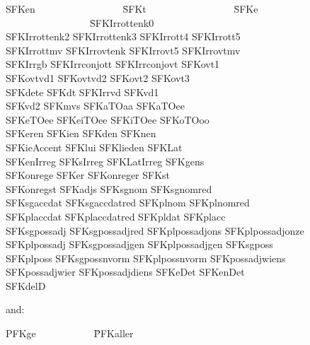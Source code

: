 \begin{tabbing}
SFKen \ \ \ \ \ \ \ \ \ \ \ \ \ \ \ \ \  \= 
SFKt  \ \ \ \ \ \ \ \ \ \ \ \ \ \ \ \ \  \=  
SFKe  \ \ \ \ \ \ \ \ \ \ \ \ \ \ \ \ \  \= 
SFKIrrottenk0 \\
SFKIrrottenk2 \>  SFKIrrottenk3 \>  SFKIrrott4 \> SFKIrrott5 \\  
SFKIrrottmv \>  SFKIrrovtenk \>  SFKIrrovt5 \> SFKIrrovtmv \\  
SFKIrrgb \>  SFKIrrconjott \>  SFKIrrconjovt \> SFKovt1 \\  
SFKovtvd1 \>  SFKovtvd2 \>  SFKovt2 \>  SFKovt3 \\  
SFKdete \> SFKdt \>  SFKIrrvd \>  SFKvd1 \\  
SFKvd2 \> SFKmvs \>  SFKaTOaa \>  SFKaTOee \\  
SFKeTOee \>  SFKeiTOee \>  SFKiTOee \> SFKoTOoo \\  
SFKeren \>  SFKien \>  SFKden \>  SFKnen \\  
SFKieAccent \>  SFKlui \> SFKlieden \>  SFKLat \\  
SFKenIrreg \>  SFKsIrreg \>  SFKLatIrreg \>  SFKgens \\  
SFKonrege \>  SFKer \>  SFKonreger \>  SFKst \\  
SFKonregst \>  SFKadjs \> SFKsgnom \>  SFKsgnomred \\  
SFKsgaccdat \>  SFKsgaccdatred \>  SFKplnom \>  SFKplnomred \\ 
SFKplaccdat \>  SFKplaccdatred \>  SFKpldat \>  SFKplacc \\  
SFKsgpossadj \>  SFKsgpossadjred \> SFKplpossadjons \>  SFKplpossadjonze \\  
SFKplpossadj \>  SFKsgpossadjgen \> SFKplpossadjgen \>  SFKsgposs \\  
SFKplposs \>  SFKsgpossnvorm \>  SFKplpossnvorm \> SFKpossadjwiens \\  
SFKpossadjwier \>  SFKpossadjdiens \> SFKeDet \>  SFKenDet \\ 
SFKdelD \>  \>  \>  \\
\end{tabbing}

and:

\begin{tabbing}
PFKge  \ \ \ \ \ \ \ \ \ \ \  \=  PFKaller \\
\end{tabbing}

